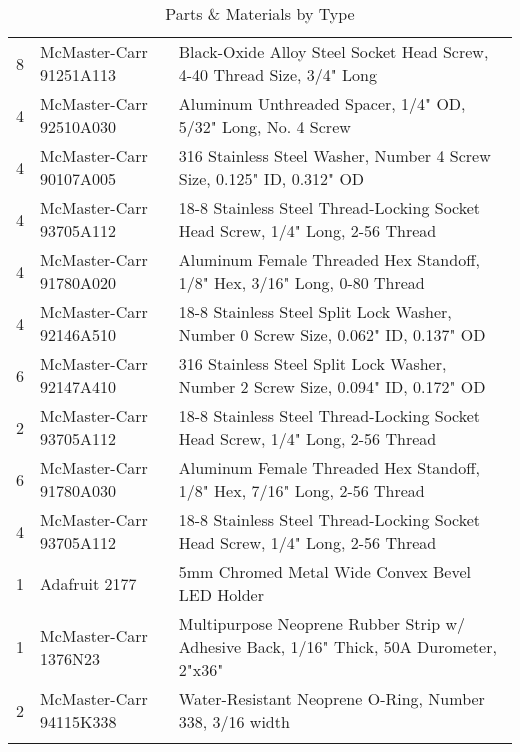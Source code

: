 \begin{longtabu}{X[1,c,m] X[6,c,m] X[9,l,m]}
  8 & McMaster-Carr 91251A113 & Black-Oxide Alloy Steel Socket Head Screw, 4-40 Thread Size, 3/4" Long \\
  4 & McMaster-Carr 92510A030 & Aluminum Unthreaded Spacer, 1/4" OD, 5/32" Long, No. 4 Screw \\
  4 & McMaster-Carr 90107A005 & 316 Stainless Steel Washer, Number 4 Screw Size, 0.125" ID, 0.312" OD \\
  4 & McMaster-Carr 93705A112 & 18-8 Stainless Steel Thread-Locking Socket Head Screw, 1/4" Long, 2-56 Thread \\
  4 & McMaster-Carr 91780A020 & Aluminum Female Threaded Hex Standoff, 1/8" Hex, 3/16" Long, 0-80 Thread \\
  4 & McMaster-Carr 92146A510 & 18-8 Stainless Steel Split Lock Washer, Number 0 Screw Size, 0.062" ID, 0.137" OD \\
  6 & McMaster-Carr 92147A410 & 316 Stainless Steel Split Lock Washer, Number 2 Screw Size, 0.094" ID, 0.172" OD \\
  2 & McMaster-Carr 93705A112 & 18-8 Stainless Steel Thread-Locking Socket Head Screw, 1/4" Long, 2-56 Thread \\
  6 & McMaster-Carr 91780A030 & Aluminum Female Threaded Hex Standoff, 1/8" Hex, 7/16" Long, 2-56 Thread \\
  4 & McMaster-Carr 93705A112 & 18-8 Stainless Steel Thread-Locking Socket Head Screw, 1/4" Long, 2-56 Thread \\
  1 & Adafruit 2177 & 5mm Chromed Metal Wide Convex Bevel LED Holder \\
  1 & McMaster-Carr 1376N23 & Multipurpose Neoprene Rubber Strip w/ Adhesive Back, 1/16" Thick, 50A Durometer, 2"x36" \\
  2 & McMaster-Carr 94115K338 & Water-Resistant Neoprene O-Ring, Number 338, 3/16 width \\

  \bhrule
\caption{Parts \& Materials by Type}
\end{longtabu}

